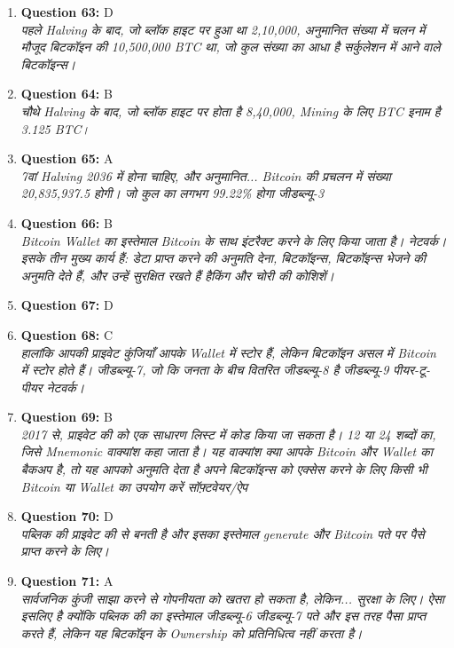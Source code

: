 \documentclass[12pt,a4paper]{article}
\begin{document}
\begin{enumerate}
\item \textbf{Question 63:} D
\\ \textit{पहले Halving के बाद, जो ब्लॉक हाइट पर हुआ था 2,10,000, अनुमानित संख्या में चलन में मौजूद बिटकॉइन की 10,500,000 BTC था, जो कुल संख्या का आधा है सर्कुलेशन में आने वाले बिटकॉइन्स।}

\item \textbf{Question 64:} B
\\ \textit{चौथे Halving के बाद, जो ब्लॉक हाइट पर होता है 8,40,000, Mining के लिए BTC इनाम है 3.125 BTC।}

\item \textbf{Question 65:} A
\\ \textit{7वां Halving 2036 में होना चाहिए, और अनुमानित... Bitcoin की प्रचलन में संख्या 20,835,937.5 होगी। जो कुल का लगभग 99.22\% होगा जीडब्ल्यू-3}

\item \textbf{Question 66:} B
\\ \textit{Bitcoin Wallet का इस्तेमाल Bitcoin के साथ इंटरैक्ट करने के लिए किया जाता है। नेटवर्क। इसके तीन मुख्य कार्य हैं: डेटा प्राप्त करने की अनुमति देना, बिटकॉइन्स, बिटकॉइन्स भेजने की अनुमति देते हैं, और उन्हें सुरक्षित रखते हैं हैकिंग और चोरी की कोशिशें।}

\item \textbf{Question 67:} D

\item \textbf{Question 68:} C
\\ \textit{हालांकि आपकी प्राइवेट कुंजियाँ आपके Wallet में स्टोर हैं, लेकिन बिटकॉइन असल में Bitcoin में स्टोर होते हैं। जीडब्ल्यू-7, जो कि जनता के बीच वितरित जीडब्ल्यू-8 है जीडब्ल्यू-9 पीयर-टू-पीयर नेटवर्क।}

\item \textbf{Question 69:} B
\\ \textit{2017 से, प्राइवेट की को एक साधारण लिस्ट में कोड किया जा सकता है। 12 या 24 शब्दों का, जिसे Mnemonic वाक्यांश कहा जाता है। यह वाक्यांश क्या आपके Bitcoin और Wallet का बैकअप है, तो यह आपको अनुमति देता है अपने बिटकॉइन्स को एक्सेस करने के लिए किसी भी Bitcoin या Wallet का उपयोग करें सॉफ़्टवेयर/ऐप}

\item \textbf{Question 70:} D
\\ \textit{पब्लिक की प्राइवेट की से बनती है और इसका इस्तेमाल generate और Bitcoin पते पर पैसे प्राप्त करने के लिए।}

\item \textbf{Question 71:} A
\\ \textit{सार्वजनिक कुंजी साझा करने से गोपनीयता को खतरा हो सकता है, लेकिन... सुरक्षा के लिए। ऐसा इसलिए है क्योंकि पब्लिक की का इस्तेमाल जीडब्ल्यू-6 जीडब्ल्यू-7 पते और इस तरह पैसा प्राप्त करते हैं, लेकिन यह बिटकॉइन के Ownership को प्रतिनिधित्व नहीं करता है।}


\end{enumerate}
\end{document}
